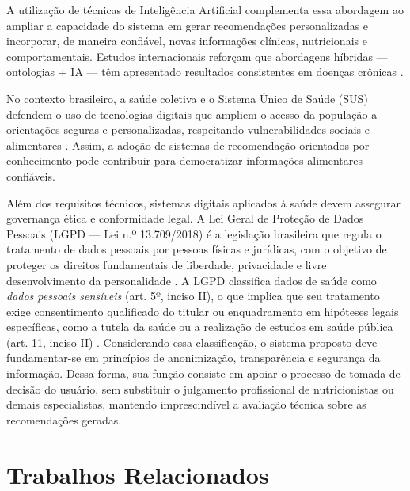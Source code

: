 \documentclass[12pt, a4paper, twocolumn]{article}
\begin{document}
A utilização de técnicas de Inteligência Artificial complementa essa abordagem ao ampliar a capacidade do sistema em gerar recomendações personalizadas e incorporar, de maneira confiável, novas informações clínicas, nutricionais e comportamentais. Estudos internacionais reforçam que abordagens híbridas --- ontologias + IA --- têm apresentado resultados consistentes em doenças crônicas \cite{zhang2023,gogebakan2024}.

No contexto brasileiro, a saúde coletiva e o Sistema Único de Saúde (SUS) defendem o uso de tecnologias digitais que ampliem o acesso da população a orientações seguras e personalizadas, respeitando vulnerabilidades sociais e alimentares \cite{krieger2023}. Assim, a adoção de sistemas de recomendação orientados por conhecimento pode contribuir para democratizar informações alimentares confiáveis.

Além dos requisitos técnicos, sistemas digitais aplicados à saúde devem assegurar governança ética e conformidade legal. A Lei Geral de Proteção de Dados Pessoais (LGPD --- Lei n.º 13.709/2018) é a legislação brasileira que regula o tratamento de dados pessoais por pessoas físicas e jurídicas, com o objetivo de proteger os direitos fundamentais de liberdade, privacidade e livre desenvolvimento da personalidade \cite{brasil2018}. A LGPD classifica dados de saúde como \textit{dados pessoais sensíveis} (art. 5º, inciso II), o que implica que seu tratamento exige consentimento qualificado do titular ou enquadramento em hipóteses legais específicas, como a tutela da saúde ou a realização de estudos em saúde pública (art. 11, inciso II) \cite{brasil2018,botelho2021}. Considerando essa classificação, o sistema proposto deve fundamentar-se em princípios de anonimização, transparência e segurança da informação. Dessa forma, sua função consiste em apoiar o processo de tomada de decisão do usuário, sem substituir o julgamento profissional de nutricionistas ou demais especialistas, mantendo imprescindível a avaliação técnica sobre as recomendações geradas.

\section{Trabalhos Relacionados}
\end{document}
